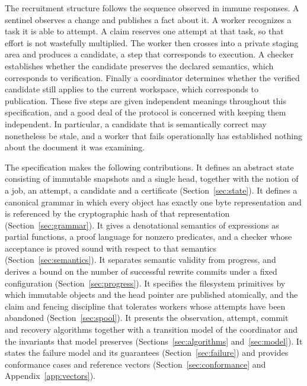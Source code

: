 \documentclass[11pt,a4paper]{article}
\theoremstyle{plain}
\theoremstyle{definition}
\theoremstyle{remark}
\theoremstyle{definition}
\begin{document}
The recruitment structure follows the sequence observed in immune responses. A sentinel observes a change and publishes a fact about it. A worker recognizes a task it is able to attempt. A claim reserves one attempt at that task, so that effort is not wastefully multiplied. The worker then crosses into a private staging area and produces a candidate, a step that corresponds to execution. A checker establishes whether the candidate preserves the declared semantics, which corresponds to verification. Finally a coordinator determines whether the verified candidate still applies to the current workspace, which corresponds to publication. These five steps are given independent meanings throughout this specification, and a good deal of the protocol is concerned with keeping them independent. In particular, a candidate that is semantically correct may nonetheless be stale, and a worker that fails operationally has established nothing about the document it was examining.

The specification makes the following contributions. It defines an abstract state consisting of immutable snapshots and a single head, together with the notion of a job, an attempt, a candidate and a certificate (Section~\ref{sec:state}). It defines a canonical grammar in which every object has exactly one byte representation and is referenced by the cryptographic hash of that representation (Section~\ref{sec:grammar}). It gives a denotational semantics of expressions as partial functions, a proof language for nonzero predicates, and a checker whose acceptance is proved sound with respect to that semantics (Section~\ref{sec:semantics}). It separates semantic validity from progress, and derives a bound on the number of successful rewrite commits under a fixed configuration (Section~\ref{sec:progress}). It specifies the filesystem primitives by which immutable objects and the head pointer are published atomically, and the claim and fencing discipline that tolerates workers whose attempts have been abandoned (Section~\ref{sec:spool}). It presents the observation, attempt, commit and recovery algorithms together with a transition model of the coordinator and the invariants that model preserves (Sections~\ref{sec:algorithms} and~\ref{sec:model}). It states the failure model and its guarantees (Section~\ref{sec:failure}) and provides conformance cases and reference vectors (Section~\ref{sec:conformance} and Appendix~\ref{app:vectors}).
\end{document}
